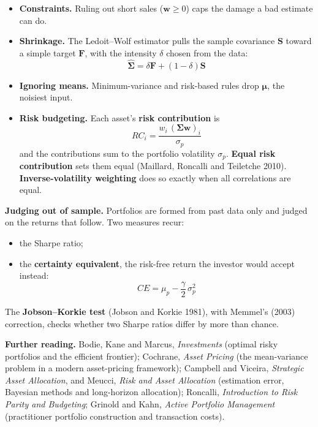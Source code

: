 \begin{itemize}
  \item \textbf{Constraints.} Ruling out short sales ($\mathbf{w} \geq 0$) caps the damage a bad estimate can do.
  \item \textbf{Shrinkage.} The Ledoit--Wolf estimator pulls the sample covariance $\mathbf{S}$ toward a simple target $\mathbf{F}$, with the intensity $\delta$ chosen from the data:
  \begin{equation}
    \hat{\boldsymbol{\Sigma}} = \delta\mathbf{F} + (1 - \delta)\mathbf{S}
    \label{eq:19-shrink}
  \end{equation}
  \item \textbf{Ignoring means.} Minimum-variance and risk-based rules drop $\boldsymbol{\mu}$, the noisiest input.
  \item \textbf{Risk budgeting.} Each asset's \textbf{risk contribution} is
  \begin{equation}
    RC_i = \frac{w_i\,(\boldsymbol{\Sigma}\mathbf{w})_i}{\sigma_p}
    \label{eq:19-rc}
  \end{equation}
  and the contributions sum to the portfolio volatility $\sigma_p$. \textbf{Equal risk contribution} sets them equal (Maillard, Roncalli and Teiletche 2010). \textbf{Inverse-volatility weighting} does so exactly when all correlations are equal.
\end{itemize}

\textbf{Judging out of sample.} Portfolios are formed from past data only and judged on the returns that follow. Two measures recur:

\begin{itemize}
  \item the Sharpe ratio;
  \item the \textbf{certainty equivalent}, the risk-free return the investor would accept instead:
  \begin{equation}
    CE = \mu_p - \frac{\gamma}{2}\,\sigma_p^2
    \label{eq:19-ce}
  \end{equation}
\end{itemize}

The \textbf{Jobson--Korkie test} (Jobson and Korkie 1981), with Memmel's (2003) correction, checks whether two Sharpe ratios differ by more than chance.

\textbf{Further reading.} Bodie, Kane and Marcus, \emph{Investments} (optimal risky portfolios and the efficient frontier); Cochrane, \emph{Asset Pricing} (the mean-variance problem in a modern asset-pricing framework); Campbell and Viceira, \emph{Strategic Asset Allocation}, and Meucci, \emph{Risk and Asset Allocation} (estimation error, Bayesian methods and long-horizon allocation); Roncalli, \emph{Introduction to Risk Parity and Budgeting}; Grinold and Kahn, \emph{Active Portfolio Management} (practitioner portfolio construction and transaction costs).

